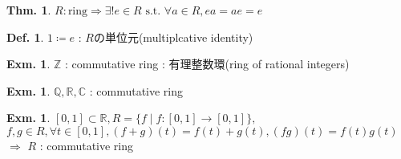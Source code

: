 \documentclass[uplatex,dvipdfmx,9pt]{beamer}
\newcommand{\st}{\text{ s.t. }}
\newcommand{\Z}{\mathbb{Z}}
\newcommand{\Q}{\mathbb{Q}}
\newcommand{\R}{\mathbb{R}}
\newcommand{\C}{\mathbb{C}}
\newcounter{textExmCount}
\theoremstyle{definition} %
\newtheorem{defn}{Def.}[subsection] %
\newtheorem{thm}{Thm.}[subsection] %
\theoremstyle{example}
\newtheorem{exmText}[textExmCount]{Exm.}
\begin{document}
      \begin{frame}
        
        \begin{thm}
          $R : \text{ring} \Rightarrow \exists! e \in R \st \forall a \in R, ea = ae = e$
        \end{thm}

        \begin{defn}
          $1 \coloneqq e$ : $R$の\alert{単位元(multiplcative identity)}         
        \end{defn}

        \begin{exmText}
          $\Z$ : commutative ring : \alert{有理整数環(ring of rational integers)}
        \end{exmText}

        \begin{exmText}
          $\Q, \R, \C$ : commutative ring
        \end{exmText}

        \begin{exmText}
          $[0, 1] \subset \R, R = \{f \mid f\colon [0, 1] \to [0, 1]\},$ \\
          $f, g \in R, \forall t \in [0, 1], (f + g)(t) = f(t) + g(t), (fg)(t) = f(t)g(t)$ $\Rightarrow$ $R$ : commutative ring
        \end{exmText}

      \end{frame}
\end{document}
